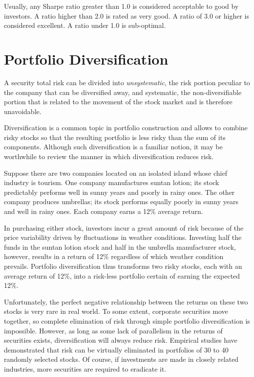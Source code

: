 Usually, any Sharpe ratio greater than 1.0 is considered acceptable to good by investors. A ratio higher than 2.0 is rated as very good. A ratio of 3.0 or higher is considered excellent. A ratio under 1.0 is sub-optimal.

\section{Portfolio Diversification}

A security total risk can be divided into \emph{unsystematic}, the risk portion peculiar to the company that can be diversified away, and systematic, the non-diversifiable portion that is related to the movement of the stock market and is therefore unavoidable. 

Diversification is a common topic in portfolio construction and allows to combine risky stocks so that the resulting portfolio is less risky than the sum of its components. Although such diversification is a familiar notion, it may be worthwhile to review the manner in which diversification reduces risk.

Suppose there are two companies located on an isolated island whose chief industry is tourism. One company manufactures suntan lotion; its stock predictably performs well in sunny years and poorly in rainy ones. The other company produces umbrellas; its stock performs equally poorly in sunny years and well in rainy ones. Each company earns a 12\% average return.

In purchasing either stock, investors incur a great amount of risk because of the price variability driven by fluctuations in weather conditions. Investing half the funds in the suntan lotion stock and half in the umbrella manufacturer stock, however, results in a return of 12\% regardless of which weather condition prevails. Portfolio diversification thus transforms two risky stocks, each with an average return of 12\%, into a risk-less portfolio certain of earning the expected 12\%.

Unfortunately, the perfect negative relationship between the returns on these two stocks is very rare in real world. To some extent, corporate securities move together, so complete elimination of risk through simple portfolio diversification is impossible. However, as long as some lack of parallelism in the returns of securities exists, diversification will always reduce risk.
Empirical studies have demonstrated that risk can be virtually eliminated in portfolios of 30 to 40 randomly selected stocks. Of course, if investments are made in closely related industries, more securities are required to eradicate it.

